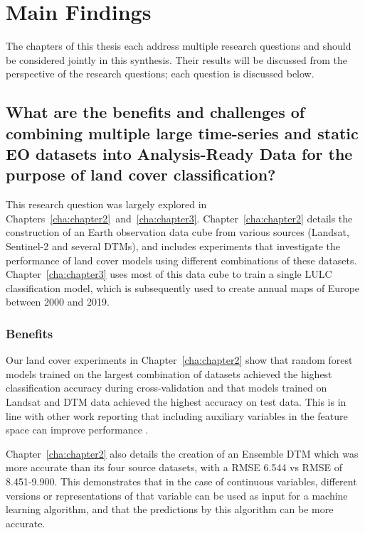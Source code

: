 \section{Main Findings}
    The chapters of this thesis each address multiple research questions and should be considered jointly in this synthesis. Their results will be discussed from the perspective of the research questions; each question is discussed below.
    
    \subsection{What are the benefits and challenges of combining multiple large time-series and static EO datasets into Analysis-Ready Data for the purpose of land cover classification?}
    \label{syn:rq1}

        This research question was largely explored in Chapters\@~\ref{cha:chapter2}\@~and\@~\ref{cha:chapter3}. Chapter\@~\ref{cha:chapter2} details the construction of an Earth observation data cube from various sources (Landsat, Sentinel-2 and several DTMs), and includes experiments that investigate the performance of land cover models using different combinations of these datasets. Chapter\@~\ref{cha:chapter3} uses most of this data cube to train a single LULC classification model, which is subsequently used to create annual maps of Europe between 2000 and 2019. 

        \subsubsection{Benefits}
    
            Our land cover experiments in Chapter\@~\ref{cha:chapter2} show that random forest models trained on the largest combination of datasets achieved the highest classification accuracy during cross-validation and that models trained on Landsat and DTM data achieved the highest accuracy on test data. This is in line with other work reporting that including auxiliary variables in the feature space can improve performance \citep{zhu2016optimizing, hurskainen2019auxiliary, hosseiny2022urban, santos2012multiscale}.

            Chapter\@~\ref{cha:chapter2} also details the creation of an Ensemble DTM which was more accurate than its four source datasets, with a RMSE 6.544 vs RMSE of 8.451-9.900. This demonstrates that in the case of continuous variables, different versions or representations of that variable can be used as input for a machine learning algorithm, and that the predictions by this algorithm can be more accurate.
            
